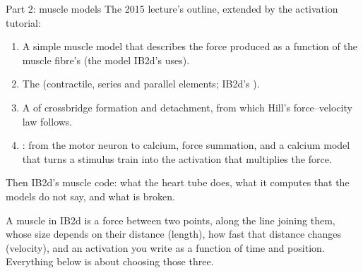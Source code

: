 \documentclass[aspectratio=169,11pt]{beamer}
\begin{document}
\begin{frame}{Part 2: muscle models}
\label{fr:musclesintro}
\small
The 2015 lecture's outline, extended by the activation tutorial:
\begin{enumerate}
  \item A simple muscle model that describes the force produced as a function of the muscle fibre's  (the model IB2d's  uses).
  \item The  (contractile, series and parallel elements; IB2d's ).
  \item A  of crossbridge formation and detachment, from which Hill's force--velocity law follows.
  \item {}: from the motor neuron to calcium, force summation, and a calcium model that turns a stimulus train into the activation that multiplies the force.
\end{enumerate}
Then IB2d's muscle code: what the heart tube does, what it computes that the models do not say, and what is broken.
\begin{punchbox}
\small A muscle in IB2d is a force between two points, along the line joining them, whose size depends on their distance (length), how fast that distance changes (velocity), and an activation you write as a function of time and position. Everything below is about choosing those three.
\end{punchbox}
\end{frame}
\end{document}
